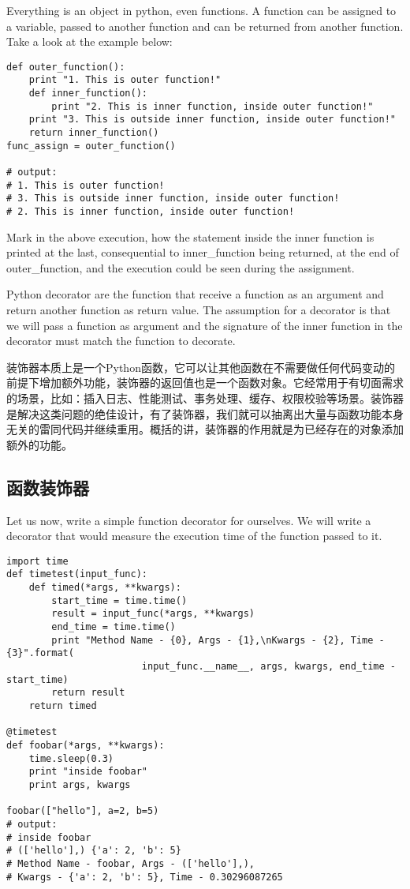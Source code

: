 Everything is an object in python, even functions. A function can be assigned to a variable, passed to another function and can be returned from another function. Take a look at the example below:

\begin{verbatim}
def outer_function():
    print "1. This is outer function!"
    def inner_function():
        print "2. This is inner function, inside outer function!"
    print "3. This is outside inner function, inside outer function!"
    return inner_function()
func_assign = outer_function()

# output:
# 1. This is outer function!
# 3. This is outside inner function, inside outer function!
# 2. This is inner function, inside outer function!
\end{verbatim}

Mark in the above execution, how the statement inside the inner function is printed at the last, consequential to inner\_function being returned, at the end of outer\_function, and the execution could be seen during the assignment.

Python decorator are the function that receive a function as an argument and return another function as return value. The assumption for a decorator is that we will pass a function as argument and the signature of the inner function in the decorator must match the function to decorate.

装饰器本质上是一个Python函数，它可以让其他函数在不需要做任何代码变动的前提下增加额外功能，装饰器的返回值也是一个函数对象。它经常用于有切面需求的场景，比如：插入日志、性能测试、事务处理、缓存、权限校验等场景。装饰器是解决这类问题的绝佳设计，有了装饰器，我们就可以抽离出大量与函数功能本身无关的雷同代码并继续重用。概括的讲，装饰器的作用就是为已经存在的对象添加额外的功能。

\subsection{函数装饰器}
Let us now, write a simple function decorator for ourselves. We will write a decorator that would measure the execution time of the function passed to it.
\begin{verbatim}
import time
def timetest(input_func):
    def timed(*args, **kwargs):
        start_time = time.time()
        result = input_func(*args, **kwargs)
        end_time = time.time()
        print "Method Name - {0}, Args - {1},\nKwargs - {2}, Time - {3}".format(
                        input_func.__name__, args, kwargs, end_time - start_time)
        return result
    return timed

@timetest
def foobar(*args, **kwargs):
    time.sleep(0.3)
    print "inside foobar"
    print args, kwargs

foobar(["hello"], a=2, b=5)
# output:
# inside foobar
# (['hello'],) {'a': 2, 'b': 5}
# Method Name - foobar, Args - (['hello'],),
# Kwargs - {'a': 2, 'b': 5}, Time - 0.30296087265
\end{verbatim}


